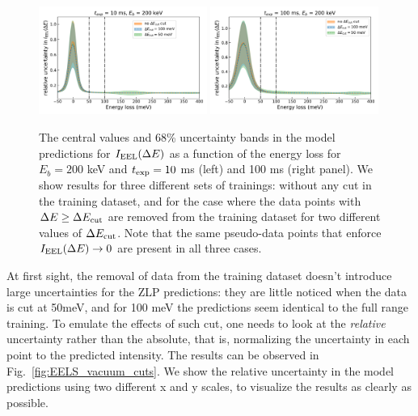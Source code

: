 \begin{figure}[H]
    \centering
    \includegraphics[width=0.49\textwidth]{plots/prediction_with_cut_10ms_absolute.pdf}
    \includegraphics[width=0.49\textwidth]{plots/prediction_with_cut_100ms_absolute.pdf}
    \caption{The central values and 68\% uncertainty bands 
    in the model predictions for $I_{\rm EEL}(\Delta E)$
      as a function of the energy loss for $E_b=200$ keV and $t_{\rm exp}=10$ ms (left)
      and 100 ms (right panel).
      We show results for three different sets of trainings: without any cut
      in the training dataset, and for the case where the data points with $\Delta E \ge \Delta E_{\rm cut}$
      are removed from the training dataset for two different values
      of $\Delta E_{\rm cut}$.
      Note that the same pseudo-data points that enforce $I_{\rm EEL}(\Delta E)\to 0$ are present
      in all three cases.
      }
      \label{fig:EELS_vacuum_DeltaE_abs}
\end{figure}


At first sight, the removal of data from the training dataset doesn't introduce large
uncertainties for the ZLP predictions: they are little noticed when the data is cut at 50meV,
and for 100 meV the predictions seem identical to the full range training.
%
To emulate the effects of such cut, one needs to look at the {\it relative} uncertainty rather
than the absolute, that is, normalizing the uncertainty in each point to the predicted intensity.
%
The results can be observed in Fig.~\ref{fig:EELS_vacuum_cuts}. We show the relative uncertainty
in the model predictions using two different x and y scales, to visualize the results
as clearly as possible.

